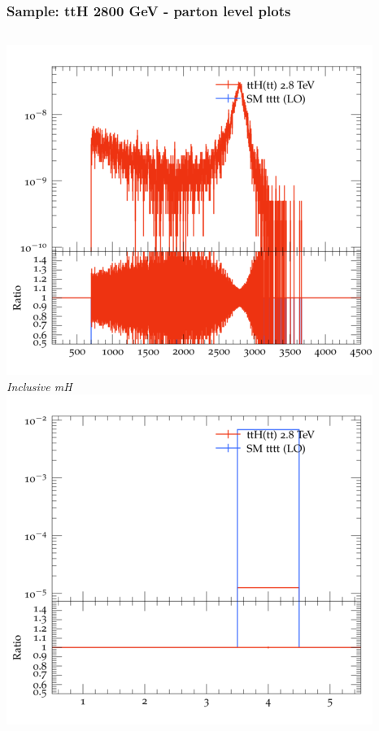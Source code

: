\documentclass{beamer}
\begin{document}
\begin{frame}
\frametitle{Sample: ttH 2800 GeV - parton level plots}
\begin{columns}
\includegraphics[width=\textwidth]{../plots/ttH_2800/tttt_ttH/Inclusive_mH.png}\\
\textit{\small Inclusive mH}
\includegraphics[width=\textwidth]{../plots/ttH_2800/tttt_ttH/Inclusive_nTop.png}\\

\end{columns}
\end{frame}
\end{document}

